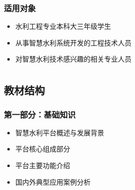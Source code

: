 \hypertarget{ux9002ux7528ux5bf9ux8c61}{%
\subsubsection{适用对象}\label{ux9002ux7528ux5bf9ux8c61}}

\begin{itemize}
\tightlist
\item
  水利工程专业本科大三年级学生
\item
  从事智慧水利系统开发的工程技术人员
\item
  对智慧水利技术感兴趣的相关专业人员
\end{itemize}

\hypertarget{section}{%
\section{}\label{section}}


\hypertarget{ux6559ux6750ux7ed3ux6784}{%
\subsection{教材结构}\label{ux6559ux6750ux7ed3ux6784}}

\hypertarget{ux7b2cux4e00ux90e8ux5206ux57faux7840ux77e5ux8bc6}{%
\subsubsection{第一部分：基础知识}\label{ux7b2cux4e00ux90e8ux5206ux57faux7840ux77e5ux8bc6}}


\begin{itemize}
\tightlist
\item
  智慧水利平台概述与发展背景
\item
  平台核心组成部分
\item
  平台主要功能介绍
\item
  国内外典型应用案例分析
\end{itemize}


